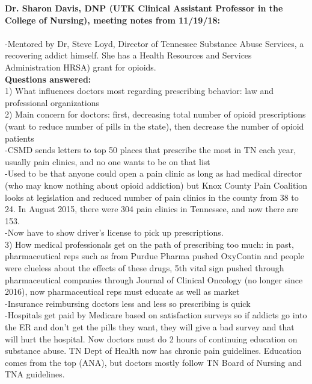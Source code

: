 \documentclass[12pt]{article}
\begin{document}
\noindent \textbf{Dr. Sharon Davis, DNP (UTK Clinical Assistant Professor in the College of Nursing), meeting notes from 11/19/18:} \\ \\
-Mentored by Dr, Steve Loyd, Director of Tennessee Substance Abuse Services, a recovering addict himself. She has a Health Resources and Services Administration HRSA) grant for opioids. \\

\noindent \textbf{Questions answered:} \\
1) What influences doctors most regarding prescribing behavior: law and professional organizations \\
2) Main concern for doctors: first, decreasing total number of opioid prescriptions (want to reduce number of pills in the state), then decrease the number of opioid patients \\
-CSMD sends letters to top 50 places that prescribe the most in TN each year, usually pain clinics, and no one wants to be on that list \\
-Used to be that anyone could open a pain clinic as long as had medical director (who may know nothing about opioid addiction) but Knox County Pain Coalition looks at legislation and reduced number of pain clinics in the county from 38 to 24. In August 2015, there were 304 pain clinics in Tennessee, and now there are 153. \\
-Now have to show driver's license to pick up prescriptions. \\
3) How medical professionals get on the path of prescribing too much: in past, pharmaceutical reps such as from Purdue Pharma pushed OxyContin and people were clueless about the effects of these drugs, 5th vital sign pushed through pharmaceutical companies through Journal of Clinical Oncology (no longer since 2016), now pharmaceutical reps must educate as well as market \\
-Insurance reimbursing doctors less and less so prescribing is quick \\
-Hospitals get paid by Medicare based on satisfaction surveys so if addicts go into the ER and don't get the pills they want, they will give a bad survey and that will hurt the hospital. Now doctors must do 2 hours of continuing education on substance abuse. TN Dept of Health now has chronic pain guidelines. Education comes from the top (ANA), but doctors mostly follow TN Board of Nursing and TNA guidelines. \\
\end{document}
